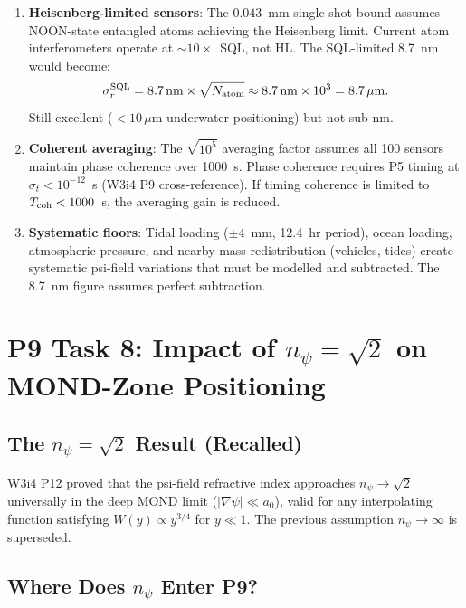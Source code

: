 \documentclass[aps,prd,twocolumn,superscriptaddress,nofootinbib]{revtex4-2}
\begin{document}
\begin{enumerate}
\item \textbf{Heisenberg-limited sensors}: The $0.043$~mm single-shot
  bound assumes NOON-state entangled atoms achieving the Heisenberg limit.
  Current atom interferometers operate at $\sim 10\times$~SQL, not HL.
  The SQL-limited 8.7~nm would become:
  \begin{equation}
  \sigma_r^{\rm SQL} = 8.7\,\mathrm{nm} \times \sqrt{N_{\rm atom}}
  \approx 8.7\,\mathrm{nm} \times 10^3 = 8.7\,\mu\mathrm{m}.
  \end{equation}
  Still excellent ($< 10\,\mu$m underwater positioning) but not sub-nm.

\item \textbf{Coherent averaging}: The $\sqrt{10^5}$ averaging factor
  assumes all 100 sensors maintain phase coherence over 1000~s. Phase
  coherence requires P5 timing at $\sigma_t < 10^{-12}$~s (W3i4 P9
  cross-reference). If timing coherence is limited to $T_{\rm coh} < 1000$~s,
  the averaging gain is reduced.

\item \textbf{Systematic floors}: Tidal loading ($\pm 4$~mm, 12.4~hr period),
  ocean loading, atmospheric pressure, and nearby mass redistribution
  (vehicles, tides) create systematic psi-field variations that must be
  modelled and subtracted. The 8.7~nm figure assumes perfect subtraction.
\end{enumerate}

\section{P9 Task 8: Impact of $n_\psi = \sqrt{2}$ on MOND-Zone Positioning}
\label{sec:npsi}

\subsection{The $n_\psi = \sqrt{2}$ Result (Recalled)}

W3i4 P12 proved that the psi-field refractive index approaches
$n_\psi \to \sqrt{2}$ universally in the deep MOND limit
($|\nabla\psi| \ll a_0$), valid for any interpolating function
satisfying $W(y) \propto y^{3/4}$ for $y \ll 1$. The previous
assumption $n_\psi \to \infty$ is superseded.

\subsection{Where Does $n_\psi$ Enter P9?}
\end{document}
